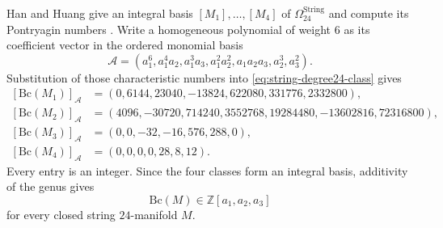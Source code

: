 \documentclass[14pt,dvipsnames]{extarticle}
\makeatletter
\numberwithin{equation}{subsection}
\theoremstyle{plain}
\theoremstyle{definition}
\theoremstyle{definition}
\renewenvironment{proof}[1][\proofname]{
 \par\pushQED{\qed}\normalfont
 \topsep6\p@\@plus6\p@\relax
 \trivlist\item[\hskip\labelsep\bfseries\itshape #1\@addpunct{.}]
}{\popQED\endtrivlist\@endpefalse}
\newcommand{\Bc}{\mathrm{Bc}}
\makeatother
\begin{document}
\begin{proof}[Proof of \cref{thm:bc-string-through24}]
Han and Huang give an integral basis $[M_1],\ldots,[M_4]$ of
$\Omega_{24}^{\mathrm{String}}$
\cite[Theorem~1 and Corollary~3]{HH22String} and compute its Pontryagin
numbers \cite[Theorem~2.1]{HH22String}. Write a homogeneous polynomial of
weight $6$ as its coefficient vector in the ordered monomial basis
\[
 \mathcal A=
 (a_1^6,a_1^4a_2,a_1^3a_3,a_1^2a_2^2,
   a_1a_2a_3,a_2^3,a_3^2).
\]
Substitution of those characteristic numbers into
\eqref{eq:string-degree24-class} gives
\begin{equation}\label{eq:string-basis-values}
\begin{aligned}
 [\Bc(M_1)]_{\mathcal A}
  &=(0,6144,23040,-13824,622080,331776,2332800),\\
 [\Bc(M_2)]_{\mathcal A}
  &=(4096,-30720,714240,3552768,19284480,-13602816,72316800),\\
 [\Bc(M_3)]_{\mathcal A}
  &=(0,0,-32,-16,576,288,0),\\
 [\Bc(M_4)]_{\mathcal A}
  &=(0,0,0,0,28,8,12).
\end{aligned}
\end{equation}
Every entry is an integer. Since the four classes form an integral basis,
additivity of the genus gives
\[
 \Bc(M)\in\mathbb Z[a_1,a_2,a_3]
\]
for every closed string $24$-manifold $M$.
\end{proof}
\end{document}
